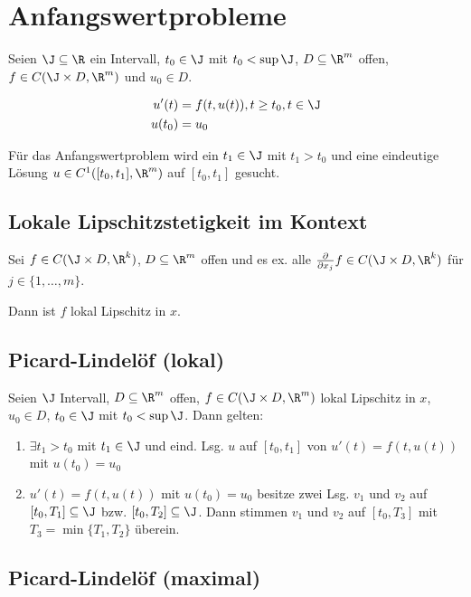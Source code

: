 \section*{Anfangswertprobleme}

Seien \(\J \subseteq \R\) ein Intervall, \(t_0 \in \J\) mit \(t_0 < \sup \J\), \(D \subseteq \R^m\) offen, \(f \in C(\J \times D, \R^m)\) und \(u_0 \in D\).

\vspace*{-4mm}
\begin{align*}
	u'(t)  &= f(t, u(t)), t\geq t_0, t\in \J \\
	u(t_0) &= u_0
\end{align*}

Für das Anfangswertproblem wird ein \(t_1 \in \J\) mit \(t_1 > t_0\) und eine eindeutige Lösung \(u \in C^1([t_0, t_1], \R^m)\) auf \([t_0, t_1]\) gesucht.

\subsection*{Lokale Lipschitzstetigkeit im Kontext}

Sei \(f \in C(\J \times D, \R^k)\), \(D \subseteq \R^m\) offen und es ex. alle \(\frac{\partial}{\partial x_j} f \in C(\J \times D, \R^k)\) für \(j \in \{1, \hdots, m\}\).

Dann ist \(f\) lokal Lipschitz in \(x\).

\subsection*{Picard-Lindelöf (lokal)}

Seien \(\J\) Intervall, \(D \subseteq \R^m\) offen, \(f \in C(\J \times D, \R^m)\) lokal Lipschitz in \(x\), \(u_0 \in D\), \(t_0 \in \J\) mit \(t_0 < \sup \J\). Dann gelten:

\begin{enumerate}[label=(\alph*)]
	\item \(\exists t_1 > t_0 \) mit \(t_1 \in \J\) und eind. Lsg. \(u\)  auf \([t_0, t_1]\) von \(u'(t) = f(t, u(t))\) mit \(u(t_0) = u_0\)
	\item \(u'(t) = f(t, u(t))\) mit \(u(t_0) = u_0\) besitze zwei Lsg. \(v_1\) und \(v_2\) auf \([t_0, T_1] \subseteq \J\) bzw. \([t_0, T_2] \subseteq \J\). Dann stimmen \(v_1\) und \(v_2\) auf \([t_0, T_3]\) mit \(T_3 = \min\{T_1, T_2\}\) überein.
\end{enumerate}

\subsection*{Picard-Lindelöf (maximal)}

